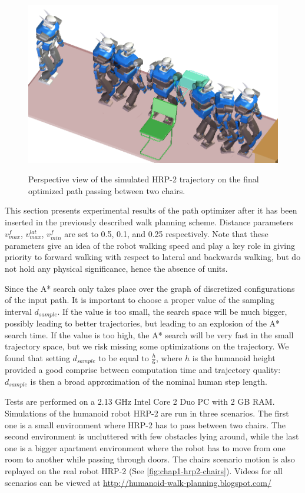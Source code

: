 \begin{figure}
  \centering
      {\includegraphics[width = \linewidth]
        {src/chap1-path-optimization/chairs-hash-optim-perspective-hrp2.png}}
      \caption{Perspective view of the simulated HRP-2 trajectory on
        the final optimized path passing between two chairs.}
      \label{fig:chap1-chairs-hash-optim-perspective-hrp2}
\end{figure}

This section presents experimental results of the path optimizer after
it has been inserted in the previously described walk planning
scheme. Distance parameters $v_{max}^f$, $v_{max}^{lat}$, $v_{min}^f$
are set to 0.5, 0.1, and 0.25 respectively. Note that these parameters
give an idea of the robot walking speed and play a key role in giving
priority to forward walking with respect to lateral and backwards
walking, but do not hold any physical significance, hence the absence
of units.

Since the A* search only takes place over the graph of discretized
configurations of the input path. It is important to choose a proper
value of the sampling interval $d_{sample}$. If the value is too
small, the search space will be much bigger, possibly leading to
better trajectories, but leading to an explosion of the A* search
time. If the value is too high, the A* search will be very fast in the
small trajectory space, but we risk missing some optimizations on the
trajectory. We found that setting $d_{sample}$ to be equal to
$\frac{h}{6}$, where $h$ is the humanoid height provided a good
comprise between computation time and trajectory quality: $d_{sample}$
is then a broad approximation of the nominal human step length.

Tests are performed on a 2.13 GHz Intel Core 2 Duo PC with 2 GB RAM.
Simulations of the humanoid robot HRP-2 are run in three scenarios.
The first one is a small environment where HRP-2 has to pass between
two chairs. The second environment is uncluttered with few obstacles
lying around, while the last one is a bigger apartment environment
where the robot has to move from one room to another while passing
through doors. The chairs scenario motion is also replayed on the real
robot HRP-2 (See \autoref{fig:chap1-hrp2-chairs}). Videos for all
scenarios can be viewed at
\url{http://humanoid-walk-planning.blogspot.com/}

